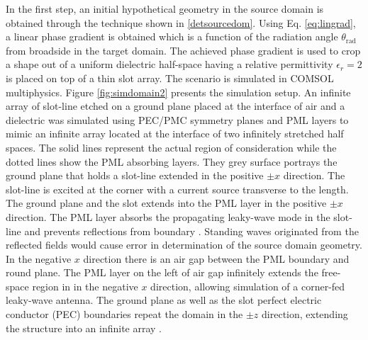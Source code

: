 In the first step, an initial hypothetical geometry in the source domain is obtained through the technique shown in \ref{detsourcedom}. Using Eq. \ref{eq:lingrad}, a linear phase gradient is obtained which is a function of the radiation angle $\theta_{\mathrm{rad}}$ from broadside in the target domain. The achieved phase gradient is used to crop a shape out of a uniform dielectric half-space having a relative permittivity $\epsilon_r = 2$ is placed on top of a thin slot array. The scenario is simulated in COMSOL multiphysics. Figure \ref{fig:simdomain2} presents the simulation setup. An infinite array of slot-line etched on a ground plane placed at the interface of air and a dielectric was simulated using PEC/PMC symmetry planes and PML layers to mimic an infinite array located at the interface of two infinitely stretched half spaces. The solid lines represent the actual region of consideration while the dotted lines show the PML absorbing layers. They grey surface portrays the ground plane that holds a slot-line extended in the positive $\pm x$ direction. The slot-line is excited at the corner with a current source transverse to the length. The ground plane and the slot extends into the PML layer in the positive $\pm x$ direction. The PML layer absorbs the propagating leaky-wave mode in the slot-line and prevents reflections from boundary \cite{chew1995}. Standing waves originated from the reflected fields would cause error in determination of the source domain geometry.  In the negative $x$ direction there is an air gap between the PML boundary and round plane. The PML layer on the left of air gap infinitely extends the free-space region in in the negative $x$ direction, allowing simulation of a corner-fed leaky-wave antenna. The ground plane as well as the slot  perfect electric conductor (PEC) boundaries repeat the domain in the $\pm z$ direction, extending the structure into an infinite array \cite{sadiku2001}.

